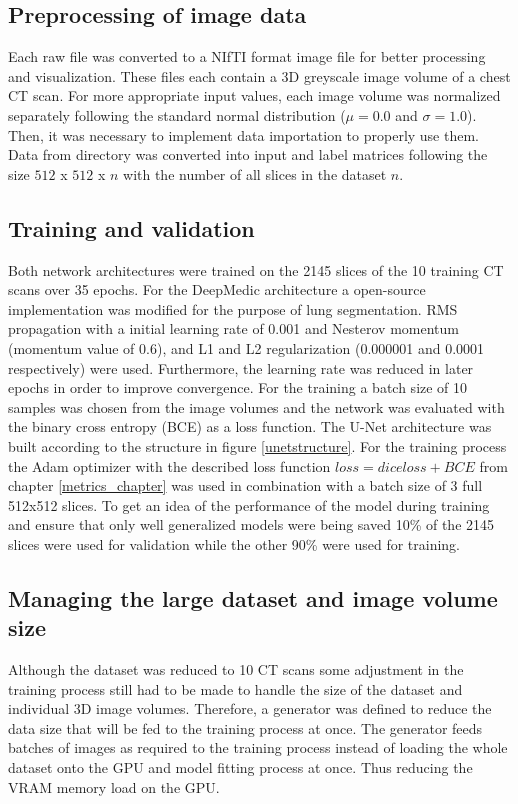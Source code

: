 \subsection{Preprocessing of image data}
Each raw file was converted to a NIfTI format image file for better processing and visualization. These files each contain a 3D greyscale image volume of a chest CT scan. For more appropriate input values, each image volume was normalized separately following the standard normal distribution ($\mu = 0.0$ and $\sigma = 1.0$).\newline
Then, it was necessary to implement data importation to properly use them. Data from directory was converted into input and label matrices following the size $512$ x $512$ x $n$ with the number of all slices in the dataset $n$.

\subsection{Training and validation}
Both network architectures were trained on the 2145 slices of the 10 training CT scans over 35 epochs.\newline
For the DeepMedic architecture a open-source implementation \cite{deepmediconline} was modified for the purpose of lung segmentation. RMS propagation with a initial learning rate of 0.001 and Nesterov momentum (momentum value of 0.6), and L1 and L2 regularization (0.000001 and 0.0001 respectively) were used. Furthermore, the learning rate was reduced in later epochs in order to improve convergence. For the training a batch size of 10 samples was chosen from the image volumes and the network was evaluated with the binary cross entropy (BCE) as a loss function.\newline
The U-Net architecture was built according to the structure in figure \ref{unetstructure}. For the training process the Adam optimizer with the described loss function $loss = dice loss + BCE$ from chapter \ref{metrics_chapter} was used in combination with a batch size of 3 full 512x512 slices. To get an idea of the performance of the model during training and ensure that only well generalized models were being saved 10\% of the 2145 slices were used for validation while the other 90\% were used for training.\newline

\subsection{Managing the large dataset and image volume size}
Although the dataset was reduced to 10 CT scans some adjustment in the training process still had to be made to handle the size of the dataset and individual 3D image volumes.\newline
Therefore, a generator was defined to reduce the data size that will be fed to the training process at once. The generator feeds batches of images as required to the training process instead of loading the whole dataset onto the GPU and model fitting process at once. Thus reducing the VRAM memory load on the GPU.

